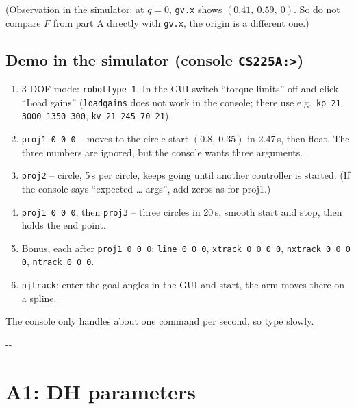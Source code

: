 \documentclass[10pt,a4paper]{article}
\makeatletter
\newcommand{\secneed}[1]{\par\penalty\@M\begingroup\setlength{\dimen@}{#1}\dimen@ii\pagegoal
  \advance\dimen@ii-\pagetotal\ifdim\dimen@>\dimen@ii\ifdim\dimen@ii>\z@\vfil\fi\penalty-\@M\fi\endgroup}
\let\oldsection\section
\renewcommand{\section}{\secneed{9\baselineskip}\oldsection}
\newcommand{\code}[1]{\texttt{#1}}
\makeatother
\begin{document}
\vspace{2pt}
(Observation in the simulator: at $q = 0$, \code{gv.x} shows $(0.41,\ 0.59,\ 0)$. So do not compare $F$ from part A
directly with \code{gv.x}, the origin is a different one.)

\subsection{Demo in the simulator (console \code{CS225A:>})}
\begin{enumerate}
  \item 3-DOF mode: \code{robottype 1}. In the GUI switch ``torque limits'' off and click ``Load gains''
        (\code{loadgains} does not work in the console; there use e.g.\ \code{kp 21 3000 1350 300}, \code{kv 21 245 70 21}).
  \item \code{proj1 0 0 0} -- moves to the circle start $(0.8,\ 0.35)$ in 2.47\,s, then float. The three numbers are
        ignored, but the console wants three arguments.
  \item \code{proj2} -- circle, 5\,s per circle, keeps going until another controller is started. (If the console says
        ``expected \ldots{} args'', add zeros as for proj1.)
  \item \code{proj1 0 0 0}, then \code{proj3} -- three circles in 20\,s, smooth start and stop, then holds the end point.
  \item Bonus, each after \code{proj1 0 0 0}: \code{line 0 0 0}, \code{xtrack 0 0 0 0}, \code{nxtrack 0 0 0 0},
        \code{ntrack 0 0 0}.
  \item \code{njtrack}: enter the goal angles in the GUI and start, the arm moves there on a spline.
\end{enumerate}
The console only handles about one command per second, so type slowly.

\section{A1: DH parameters}
\end{document}
